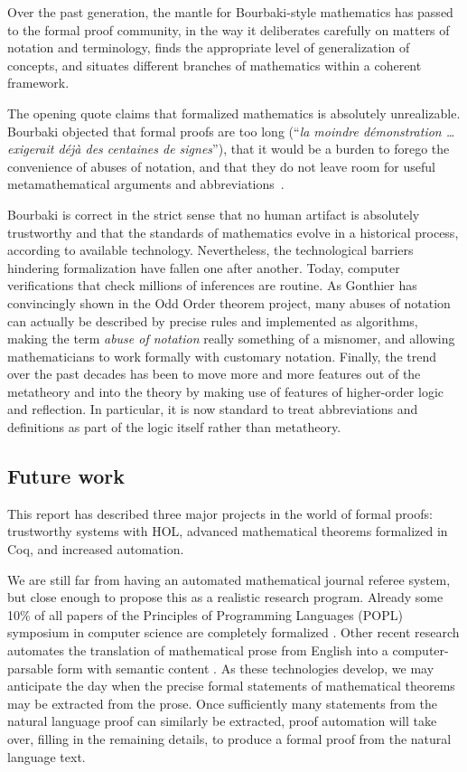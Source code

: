 \documentclass[brochure,english,12pt]{bourbaki}
\theoremstyle{plain}
\begin{document}
Over the past generation, the mantle for Bourbaki-style mathematics
has passed to the formal proof community, in the way it deliberates
carefully on matters of notation and terminology, finds the appropriate
level of generalization of concepts, and situates
different branches of mathematics within a coherent framework.

The opening quote claims that formalized mathematics is absolutely
unrealizable.  Bourbaki objected that formal proofs are too long
(``{\it la moindre d\'emonstration \ldots exigerait d\'ej\`a des
  centaines de signes}''), that it would be a burden to forego the
convenience of abuses of notation, and that they do not leave room for
useful metamathematical arguments and
abbreviations~\cite{bourbaki1966theorie}.

Bourbaki is correct in the strict sense that no human artifact is
absolutely trustworthy and that the standards of mathematics evolve in
a historical process, according to available technology.
Nevertheless, the technological barriers hindering formalization have
fallen one after another.  Today, computer verifications that check
millions of inferences are routine.  As Gonthier has convincingly
shown in the Odd Order theorem project, many abuses of notation can
actually be described by precise rules and implemented as algorithms,
making the term {\it abuse of notation} really something of a
misnomer, and allowing mathematicians to work formally with
customary notation.  Finally, the trend over the past decades has been
to move more and more features out of the metatheory and into the
theory by making use of features of higher-order logic and reflection.  In
particular, it is now standard to treat abbreviations and definitions
as part of the logic itself rather than metatheory.

\subsection{Future work}

This report has described three major projects in the world of formal
proofs: trustworthy systems with HOL, advanced mathematical theorems
formalized in Coq, and increased automation.

We are still far from having an automated mathematical journal referee
system, but close enough to propose this as a realistic research
program.  Already some 10\% of all papers of the Principles of
Programming Languages (POPL) symposium in computer science are
completely formalized \cite{SewPOPL2014}.  Other recent research automates the
translation of mathematical prose from English into a
computer-parsable form with semantic content
\cite{ganesalingam2013language}.  As these technologies develop, we
may anticipate the day when the precise formal statements of
mathematical theorems may be extracted from the prose.  Once
sufficiently many statements from the natural language proof can
similarly be extracted, proof automation will take over, filling in
the remaining details, to produce a formal proof from the natural
language text.
\end{document}
